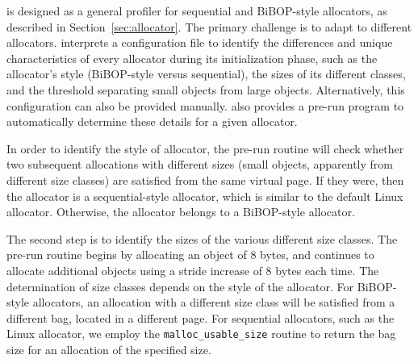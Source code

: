 \MP{} is designed as a general profiler for sequential and BiBOP-style allocators, as described in Section~\ref{sec:allocator}. The primary challenge is to adapt to different allocators. \MP{} interprets a configuration file to identify the differences and unique characteristics of every allocator during its initialization phase, such as the allocator's style (BiBOP-style versus sequential), the sizes of its different classes, and the threshold separating small objects from large objects. Alternatively, this configuration can also be provided manually. \MP{} also provides a pre-run program to automatically determine these details for a given allocator.

In order to identify the style of allocator, the pre-run routine will check whether two subsequent allocations with different sizes (small objects, apparently from different size classes) are satisfied from the same virtual page. If they were, then the allocator is a sequential-style allocator, which is similar to the default Linux allocator. Otherwise, the allocator belongs to a BiBOP-style allocator. 

The second step is to identify the sizes of the various different size classes. The pre-run routine begins by allocating an object of 8 bytes, and continues to allocate additional objects using a stride increase of 8 bytes each time. The determination of size classes depends on the style of the allocator. For BiBOP-style allocators, an allocation with a different size class will be satisfied from a different bag, located in a different page. For sequential allocators, such as the Linux allocator, we employ the \texttt{malloc\_usable\_size} routine to return the bag size for an allocation of the specified size. 

